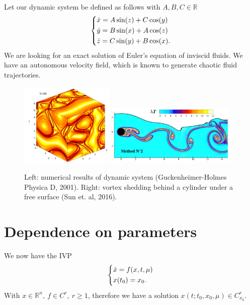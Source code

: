 \begin{ex}
	Let our dynamic system be defined as follows with $A,B,C \in \mathbb{R}$
\begin{align}
	\begin{dcases}
		\dot{x} = A \sin(z) + C \cos(y) \\
		\dot{y} = B \sin(x) + A \cos(z) \\
		\dot{z} = C \sin(y) + B \cos(x).
	\end{dcases}
\end{align}
We are looking for an exact solution of Euler's equation of inviscid fluids. We have an autonomous velocity field, which is known to generate chaotic fluid trajectories.
\begin{figure}[h]
	\centering
	\includegraphics[width=0.4\textwidth]{figures/ch1/14fluid1.png}
	\hspace{0.03\textwidth}
	\includegraphics[width=0.55\textwidth]{figures/ch1/15vortex_shedding.png}
	\caption{Left: numerical results of dynamic system (Guckenheimer-Holmes Physica D, 2001). Right: vortex shedding behind a cylinder under a free surface (Sun et. al, 2016).}
\end{figure}
\end{ex}
\vfill
\section{Dependence on parameters}
We now have the IVP
\begin{align}
	\begin{dcases}
		\dot{x} = f(x,t, \mu ) \\ x(t_0) = x_0.
	\end{dcases}
\end{align}
With $x \in \mathbb{R}^{n},\ f\in C^r,\ r\geq 1$, therefore we have a solution $x(t; t_0, x_0, \mu ) \in C^r_{x_0}$.

